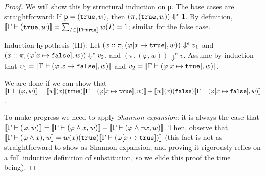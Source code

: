 \documentclass{tufte-handout}
\begin{document}
\begin{proof}
  We will show this by structural induction on \texttt{p}. 
  The base cases are straightforward: If $\texttt{p} = (\texttt{true}, w)$, then 
  $(\pi, (\texttt{true}, w)) \Downarrow^e 1$. By definition, $\llbracket {\Gamma \vdash (\texttt{true}, w)} \rrbracket = \sum_{I \in \llbracket {\Gamma \vdash \texttt{true}} \rrbracket} w(I) = 1$; 
  similar for the false case.

  Induction hypothesis (IH): Let $(x::\pi, (\varphi[x \mapsto \texttt{true}], w))
  \Downarrow^e v_1$ and $(x::\pi, (\varphi[x \mapsto \texttt{false}], w)) \Downarrow^e
  v_2$, and $(\pi, (\varphi, w)) \Downarrow^e v$. Assume by induction that $v_1
  = \llbracket {\Gamma \vdash (\varphi[x \mapsto \texttt{false}], w)} \rrbracket$ and $v_2 =
  \llbracket {\Gamma \vdash (\varphi [x \mapsto \texttt{true}], w)} \rrbracket$. 
  
  We are done if we can show that
$\llbracket {\Gamma \vdash (\varphi, w)} \rrbracket =
\llbracket {w} \rrbracket(x)(\texttt{true})\llbracket {\Gamma \vdash (\varphi[x \mapsto \texttt{true}], w)} \rrbracket +
\llbracket {w} \rrbracket(x)(\texttt{false})\llbracket {\Gamma \vdash (\varphi[x \mapsto \texttt{false}], w)} \rrbracket$.

To make progress we need to apply \emph{Shannon expansion}: it is always the case that 
$\llbracket {\Gamma \vdash (\varphi, w)} \rrbracket = \llbracket {\Gamma \vdash (\varphi \land x, w)} \rrbracket + 
\llbracket {\Gamma \vdash (\varphi \land \neg x, w)} \rrbracket$.
Then, observe that $\llbracket {\Gamma \vdash (\varphi \land x), w} \rrbracket = w(x)(\texttt{true})
\llbracket {\Gamma \vdash (\varphi[x \mapsto \texttt{true}])} \rrbracket$ (this fact is not as straightforward
to show as Shannon expansion, and proving it rigorously relies on a 
full inductive definition of substitution, so we elide this proof the time being). 






\end{proof}
\end{document}

